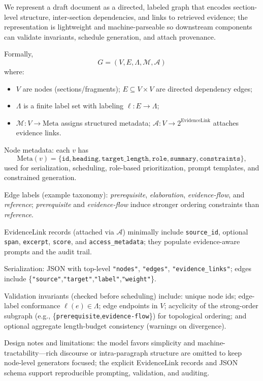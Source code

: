 We represent a draft document as a directed, labeled graph that encodes section-level structure, inter-section dependencies, and links to retrieved evidence; the representation is lightweight and machine-parseable so downstream components can validate invariants, schedule generation, and attach provenance.

Formally,
\[
G = (V,E,\Lambda,\mathcal{M},\mathcal{A})
\]
where: \begin{itemize}
  \item $V$ are nodes (sections/fragments); $E\subseteq V\times V$ are directed dependency edges;
  \item $\Lambda$ is a finite label set with labeling $\ell:E\to\Lambda$;
  \item $\mathcal{M}:V\to\mathrm{Meta}$ assigns structured metadata; $\mathcal{A}:V\to 2^{\mathrm{EvidenceLink}}$ attaches evidence links.
\end{itemize}

Node metadata: each $v$ has
\[
\mathrm{Meta}(v)=\{\texttt{id},\texttt{heading},\texttt{target\_length},\texttt{role},\texttt{summary},\texttt{constraints}\},
\]
used for serialization, scheduling, role-based prioritization, prompt templates, and constrained generation.

Edge labels (example taxonomy): \emph{prerequisite}, \emph{elaboration}, \emph{evidence-flow}, and \emph{reference}; \emph{prerequisite} and \emph{evidence-flow} induce stronger ordering constraints than \emph{reference}.

EvidenceLink records (attached via $\mathcal{A}$) minimally include \texttt{source\_id}, optional \texttt{span}, \texttt{excerpt}, \texttt{score}, and \texttt{access\_metadata}; they populate evidence-aware prompts and the audit trail.

Serialization: JSON with top-level \texttt{"nodes"}, \texttt{"edges"}, \texttt{"evidence\_links"}; edges include \{\texttt{"source"},\texttt{"target"},\texttt{"label"},\texttt{"weight"}\}.

Validation invariants (checked before scheduling) include: unique node ids; edge-label conformance $\ell(e)\in\Lambda$; edge endpoints in $V$; acyclicity of the strong-order subgraph (e.g., \{\texttt{prerequisite},\texttt{evidence-flow}\}) for topological ordering; and optional aggregate length-budget consistency (warnings on divergence).

Design notes and limitations: the model favors simplicity and machine-tractability—rich discourse or intra-paragraph structure are omitted to keep node-level generators focused; the explicit EvidenceLink records and JSON schema support reproducible prompting, validation, and auditing.